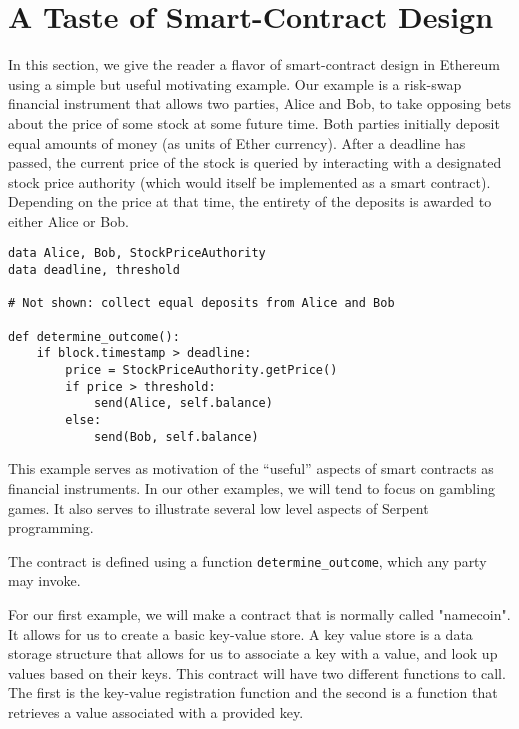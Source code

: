 \documentclass[10pt,twocolumn,letterpaper]{article}
\begin{document}
\section{A Taste of Smart-Contract Design}

In this section, we give the reader a flavor of smart-contract design in Ethereum using a simple but useful motivating example. Our example is a risk-swap financial instrument that allows two parties, Alice and Bob, to take opposing bets about the price of some stock at some future time. Both parties initially deposit equal amounts of money (as units of Ether currency). After a deadline has passed, the current price of the stock is queried by interacting with a designated stock price authority (which would itself be implemented as a smart contract). Depending on the price at that time, the entirety of the deposits is awarded to either Alice or Bob.

\begin{mdframed}
\begin{verbatim}
data Alice, Bob, StockPriceAuthority
data deadline, threshold

# Not shown: collect equal deposits from Alice and Bob

def determine_outcome():
    if block.timestamp > deadline: 
        price = StockPriceAuthority.getPrice()
        if price > threshold:
            send(Alice, self.balance)
        else:
            send(Bob, self.balance)
\end{verbatim}
\end{mdframed}

This example serves as motivation of the ``useful'' aspects of smart contracts as financial instruments. In our other examples, we will tend to focus on gambling games. It also serves to illustrate several low level aspects of Serpent programming.

The contract is defined using a function \texttt{determine\_outcome}, which any party may invoke.

For our first example, we will make a contract that is normally called "namecoin". It allows for us to create a basic key-value store. A key value store is a data storage structure that allows for us to associate a key with a value, and look up values based on their keys. This contract will have two different functions to call. The first is the key-value registration function and the second is a function that retrieves a value associated with a provided key.
\end{document}
